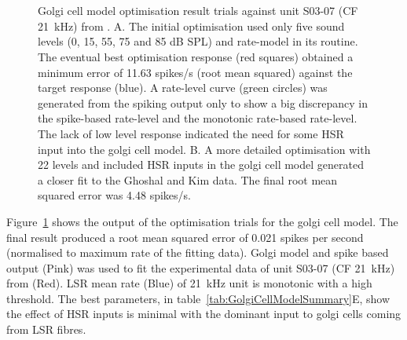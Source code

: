 \begin{figure}[htb]
  \centering 
\hspace{2pt}\hspace{0.5\textwidth}\hfill\\
 \\
\caption{Golgi cell model optimisation result trials against unit S03-07 (CF 21~kHz) from \citep{GhoshalKim:1996}. A. The initial optimisation used only five sound levels (0, 15, 55, 75 and 85 dB SPL) and rate-model in its routine. The eventual best optimisation response (red squares) obtained a minimum error of 11.63 spikes/s (root mean squared) against the target response (blue). A rate-level curve (green circles) was generated from the spiking output only to show a big discrepancy in the spike-based rate-level and the monotonic rate-based rate-level. The lack of low level response indicated the need for some HSR input into the golgi cell model. B. A more detailed optimisation with 22 levels and included HSR inputs in the golgi cell model generated a closer fit to the Ghoshal and Kim data.  The final root mean squared error was 4.48 spikes/s.  }\label{fig:GolgiResult}
\end{figure}



Figure~\ref{fig:GolgiResult} shows the output of the optimisation trials for the
golgi cell model.  The final result produced a root mean squared error of 0.021
spikes per second (normalised to maximum rate of the fitting data). Golgi model
and spike based output (Pink) was used to fit the experimental data of unit
S03-07 (CF 21~kHz) from \citep{GhoshalKim:1996} (Red).  LSR mean rate (Blue) of
21~kHz unit is monotonic with a high threshold.  The best parameters, in
table~\ref{tab:GolgiCellModelSummary}E, show the effect of HSR inputs is minimal
with the dominant input to golgi cells coming from LSR fibres.


